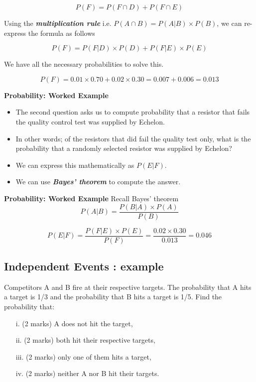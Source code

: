 \documentclass[]{report}
\begin{document}
\[ P(F)  = P(F \cap D) + P(F \cap E) \]



Using the \textbf{\emph{multiplication rule}}  i.e. $P(A \cap B) = P(A|B) \times P(B)$, we can re-express the formula as follows

\[ P(F)  = P(F|D) \times P(D) + P(F|E) \times P(E) \]

We have all the necessary probabilities to solve this.

\[ P(F)  = 0.01 \times 0.70 + 0.02 \times 0.30   = 0.007 + 0.006  = 0.013\]





{
	\noindent \textbf{Probability: Worked Example}
	
	\begin{itemize}
		\item
		The second question asks us to compute probability that a resistor that fails the quality control test was supplied by Echelon.
		\item In other words; of the resistors that did fail the quality test only, what is the probability that a randomly selected resistor was supplied by Echelon?
		\item We can express this mathematically as $P(E|F)$.
		\item We can use \textbf{\emph{Bayes' theorem}} to compute the answer.
	\end{itemize}
	
	
	
	\noindent \textbf{Probability: Worked Example}
	Recall Bayes' theorem
	\[ P(A|B) = \frac{P(B|A)\times P(A)}{P(B)} \]
	\bigskip
	
	\[ P(E|F) = \frac{P(F|E)\times P(E)}{P(F)}  =  \frac{0.02 \times 0.30}{0.013} = 0.046\]
	
}

\subsection{Independent Events : example}
Competitors A and B fire at their respective targets. The probability that A hits a target is 1/3 and the probability that B hits a target is 1/5. Find the probability that:
\begin{itemize}
	\item[i.] (2 marks) A does not hit the target,
	\item[ii.](2 marks)  both hit their respective targets,
	\item[iii.](2 marks)  only one of them hits a target,
	\item[iv.](2 marks) neither A nor B hit their targets.
\end{itemize}
\end{document}
